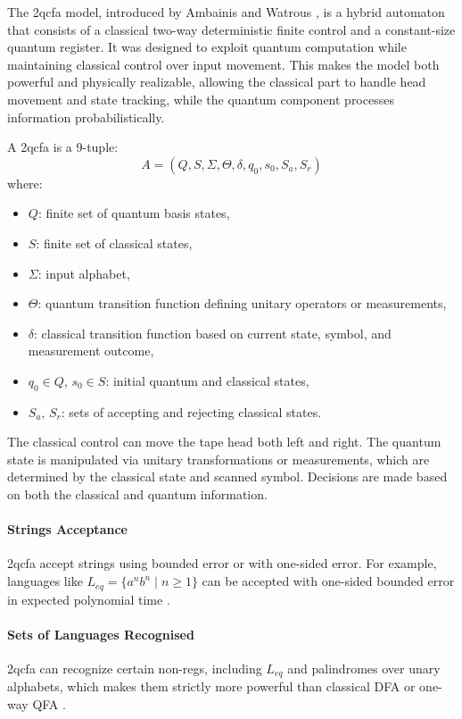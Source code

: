   
The \gls{2qcfa} model, introduced by Ambainis and Watrous \cite{ambainis2002two}, is a hybrid automaton that consists of a classical two-way deterministic finite control and a constant-size quantum register. It was designed to exploit quantum computation while maintaining classical control over input movement. This makes the model both powerful and physically realizable, allowing the classical part to handle head movement and state tracking, while the quantum component processes information probabilistically.

\begin{definition}
A \gls{2qcfa} is a 9-tuple:
\[
A = (Q, S, \Sigma, \Theta, \delta, q_0, s_0, S_a, S_r)
\]
where:
\begin{itemize}
    \item $Q$: finite set of quantum basis states,
    \item $S$: finite set of classical states,
    \item $\Sigma$: input alphabet,
    \item $\Theta$: quantum transition function defining unitary operators or measurements,
    \item $\delta$: classical transition function based on current state, symbol, and measurement outcome,
    \item $q_0 \in Q$, $s_0 \in S$: initial quantum and classical states,
    \item $S_a$, $S_r$: sets of accepting and rejecting classical states.
\end{itemize}
\end{definition}

The classical control can move the tape head both left and right. The quantum state is manipulated via unitary transformations or measurements, which are determined by the classical state and scanned symbol. Decisions are made based on both the classical and quantum information.

\paragraph{Strings Acceptance}  
\gls{2qcfa} accept strings using bounded error or with one-sided error. For example, languages like $L_{eq} = \{ a^n b^n \mid n \geq 1 \}$ can be accepted with one-sided bounded error in expected polynomial time \cite{ambainis2002two}.

\paragraph{Sets of Languages Recognised}  
\gls{2qcfa} can recognize certain non-\glspl{reg}, including $L_{eq}$ and palindromes over unary alphabets, which makes them strictly more powerful than classical DFA or one-way QFA \cite{ambainis2002two, li2015hybrid}.

